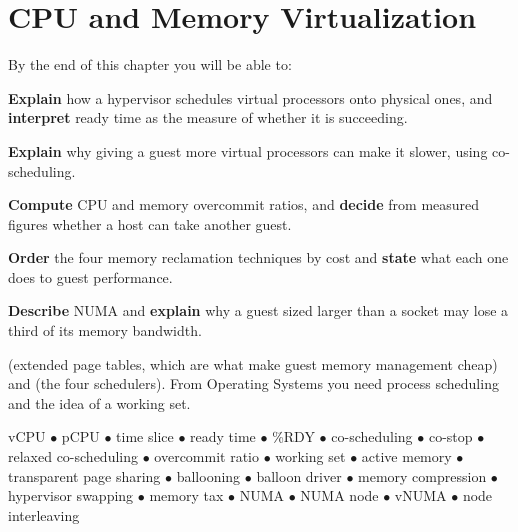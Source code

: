 \chapter{CPU and Memory Virtualization}\label{ch:cpumem}

\begin{outcomes}
By the end of this chapter you will be able to:
\begin{tight}
  \item \textbf{Explain} how a hypervisor schedules virtual processors onto
        physical ones, and \textbf{interpret} ready time as the measure of
        whether it is succeeding.
  \item \textbf{Explain} why giving a guest more virtual processors can make it
        slower, using co-scheduling.
  \item \textbf{Compute} CPU and memory overcommit ratios, and \textbf{decide}
        from measured figures whether a host can take another guest.
  \item \textbf{Order} the four memory reclamation techniques by cost and
        \textbf{state} what each one does to guest performance.
  \item \textbf{Describe} NUMA and \textbf{explain} why a guest sized larger
        than a socket may lose a third of its memory bandwidth.
\end{tight}
\end{outcomes}

\begin{prereq}
 (extended page tables, which are what make guest memory
management cheap) and  (the four schedulers). From Operating
Systems you need process scheduling and the idea of a working set.
\end{prereq}

\begin{keyterms}
vCPU $\bullet$ pCPU $\bullet$ time slice $\bullet$ ready time $\bullet$ \%RDY
$\bullet$ co-scheduling $\bullet$ co-stop $\bullet$ relaxed co-scheduling
$\bullet$ overcommit ratio $\bullet$ working set $\bullet$ active memory
$\bullet$ transparent page sharing $\bullet$ ballooning $\bullet$ balloon
driver $\bullet$ memory compression $\bullet$ hypervisor swapping $\bullet$
memory tax $\bullet$ NUMA $\bullet$ NUMA node $\bullet$ vNUMA $\bullet$ node
interleaving
\end{keyterms}

